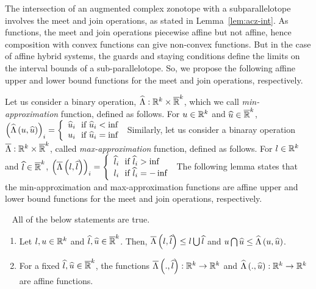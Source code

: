 The intersection of an augmented complex zonotope with a
subparallelotope involves the meet and join operations, as stated in
Lemma~\ref{lem:acz-int}.  As functions, the meet and join operations
piecewise affine but not affine, hence composition with convex
functions can give non-convex functions.  But in the case of affine
hybrid systems, the guards and staying conditions define the limits on
the interval bounds of a sub-parallelotope.  So, we propose the
following affine upper and lower bound functions for the meet and join
operations, respectively.

Let us consider a binary operation,
$\widehat{\Lambda}:\mathbb{R}^k\times\mathbb{\overline{R}}^k$, which we
call \emph{min-approximation} function, defined as follows.  For
$u\in\mathbb{R}^k$ and $\widehat{u}\in\mathbb{\overline{R}}^k$,
$\left(\widehat{\Lambda}\left(u,\widehat{u}\right)\right)_i = \left\{
\begin{array}{l}
\widehat{u}_i~~\text{if}~\widehat{u}_i<\inf\\
u_i~~\text{if}~\widehat{u}_i=\inf
\end{array}
\right.$
Similarly, let us consider a binaray operation
$\overline{\Lambda}:\mathbb{R}^k\times\mathbb{\overline{R}}^k$,
called \emph{max-approximation} function, defined as follows.  For
$l\in\mathbb{R}^k$ and $\widehat{l}\in\mathbb{\overline{R}}^k$,
$\left(\overline{\Lambda}\left(l,\widehat{l}\right)\right)_i = \left\{
\begin{array}{l}
\widehat{l}_i~~\text{if}~\widehat{l}_i>\inf\\
l_i~~\text{if}~\widehat{l}_i=-\inf
\end{array}
\right.$
%
The following lemma states that the min-approximation and
max-approximation functions are affine upper and lower bound functions
for the meet and join operations, respectively.
%
\begin{lemma}~\label{lem:min-max-approx}
All of the below statements are true.
\begin{enumerate}
\item Let $l,u\in\mathbb{R}^k$ and $\widehat{l},\widehat{u}\in\mathbb{\overline{R}}^k$.
  Then, $\overline{\Lambda}\left(l,\widehat{l}\right)\leq l\bigcup\widehat{l}$ and
  $u\bigcap\widehat{u}\leq\widehat{\Lambda}\left(u,\widehat{u}\right)$.
\item For a fixed $\widehat{l},\widehat{u}\in\mathbb{\overline{R}}^k$, the functions
  $\overline{\Lambda}\left(.,\widehat{l}\right):\mathbb{R}^k\rightarrow\mathbb{R}^k$ and
  $\widehat{\Lambda}\left(.,\widehat{u}\right):\mathbb{R}^k\rightarrow\mathbb{R}^k$ are affine functions.
\end{enumerate}
\end{lemma}





